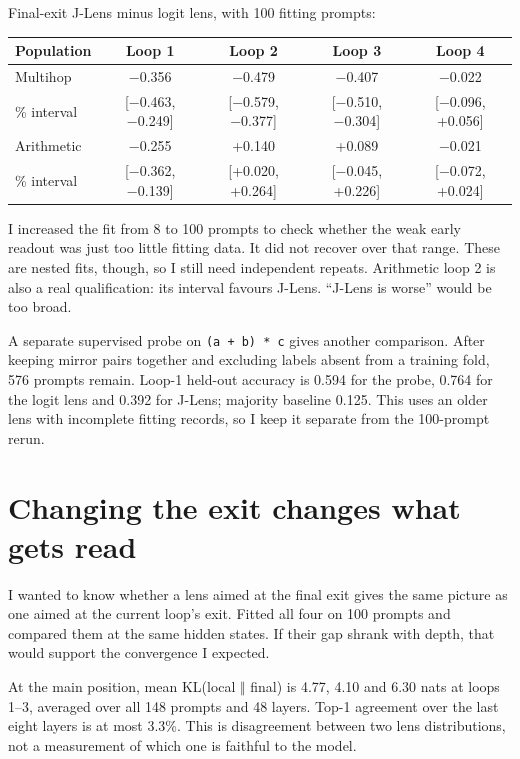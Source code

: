 \documentclass[11pt]{article}
\begin{document}
Final-exit J-Lens minus logit lens, with 100 fitting prompts:


\begin{center}
\small
\begin{tabularx}{\linewidth}{@{}>{\raggedright\arraybackslash}Xcccc@{}}
\toprule
\rowcolor{KirinAccentPale} {\sffamily\bfseries Population} & {\sffamily\bfseries Loop 1} & {\sffamily\bfseries Loop 2} & {\sffamily\bfseries Loop 3} & {\sffamily\bfseries Loop 4} \\
\midrule
Multihop & −0.356 & −0.479 & −0.407 & −0.022 \\
95\% interval & [−0.463, −0.249] & [−0.579, −0.377] & [−0.510, −0.304] & [−0.096, +0.056] \\
Arithmetic & −0.255 & +0.140 & +0.089 & −0.021 \\
95\% interval & [−0.362, −0.139] & [+0.020, +0.264] & [−0.045, +0.226] & [−0.072, +0.024] \\
\bottomrule
\end{tabularx}
\end{center}

I increased the fit from 8 to 100 prompts to check whether the weak early readout was just too little fitting data. It did not recover over that range. These are nested fits, though, so I still need independent repeats. Arithmetic loop 2 is also a real qualification: its interval favours J-Lens. “J-Lens is worse” would be too broad.

A separate supervised probe on \texttt{(a + b) * c} gives another comparison. After keeping mirror pairs together and excluding labels absent from a training fold, 576 prompts remain. Loop-1 held-out accuracy is 0.594 for the probe, 0.764 for the logit lens and 0.392 for J-Lens; majority baseline 0.125. This uses an older lens with incomplete fitting records, so I keep it separate from the 100-prompt rerun.

\clearpage
\section{Changing the exit changes what gets read}

I wanted to know whether a lens aimed at the final exit gives the same picture as one aimed at the current loop's exit. Fitted all four on 100 prompts and compared them at the same hidden states. If their gap shrank with depth, that would support the convergence I expected.

At the main position, mean KL(local \ensuremath{\Vert} final) is 4.77, 4.10 and 6.30 nats at loops 1–3, averaged over all 148 prompts and 48 layers. Top-1 agreement over the last eight layers is at most 3.3\%. This is disagreement between two lens distributions, not a measurement of which one is faithful to the model.
\end{document}
